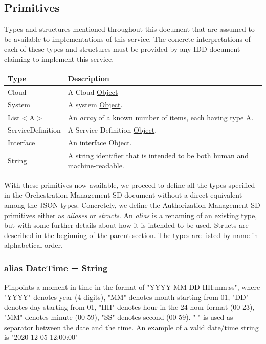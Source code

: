 \documentclass[a4paper]{arrowhead}
\newcommand{\pdef}[1]{{\textcolor{ArrowheadGrey}{#1\label{sec:model:primitives:#1}\label{sec:model:primitives:#1s}\label{sec:model:primitives:#1es}}}}
\newcommand{\pref}[1]{{\textcolor{ArrowheadGrey}{\hyperref[sec:model:primitives:#1]{#1}}}}
\begin{document}
\subsection{Primitives}
\label{sec:model:primitives}

Types and structures mentioned throughout this document that are assumed to be available to implementations of this service.
The concrete interpretations of each of these types and structures must be provided by any IDD document claiming to implement this service.

\begin{table}[ht!]
\begin{tabularx}{\textwidth}{| p{3cm} | X |} \hline
\rowcolor{gray!33} Type & Description \\ \hline
\pdef{Cloud}        & A Cloud \pref{Object} \\ \hline
\pdef{System}               & A system \pref{Object}. \\ \hline
\pdef{List}$<$A$>$      & An \textit{array} of a known number of items, each having type A. \\ \hline
\pdef{ServiceDefinition} & A Service Definition \pref{Object}. \\ \hline
\pdef{Interface} & An interface \pref{Object}. \\ \hline
\pdef{String}             & A string identifier that is intended to be both human and machine-readable. \\ \hline
\end{tabularx}
\end{table}

With these primitives now available, we proceed to define all the types specified in the Orchestration Management SD document without a direct equivalent among the JSON types.
Concretely, we define the Authorization Management SD primitives either as \textit{aliases} or \textit{structs}.
An \textit{alias} is a renaming of an existing type, but with some further details about how it is intended to be used.
Structs are described in the beginning of the parent section.
The types are listed by name in alphabetical order.

\subsubsection{alias \pdef{DateTime} = \pref{String}}

Pinpoints a moment in time in the format of "YYYY-MM-DD HH:mm:ss", where "YYYY" denotes year (4 digits), "MM" denotes month starting from 01, "DD" denotes day starting from 01, "HH" denotes hour in the 24-hour format (00-23), "MM" denotes minute (00-59), "SS" denotes second (00-59). " " is used as separator between the date and the time.
An example of a valid date/time string is "2020-12-05 12:00:00"
\end{document}
